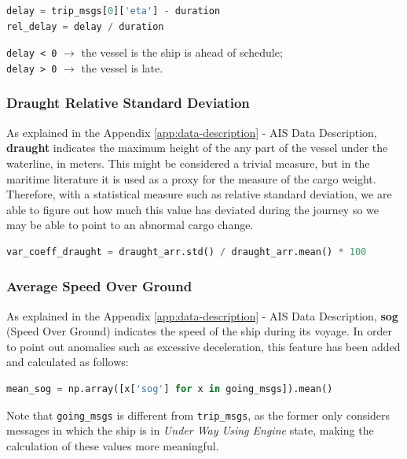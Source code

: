         \begin{lstlisting}[language=Python]
delay = trip_msgs[0]['eta'] - duration
rel_delay = delay / duration
        \end{lstlisting} 
        
        \verb|delay < 0| $\rightarrow$ the vessel is the ship is ahead of schedule;
        \\
        \verb|delay > 0| $\rightarrow$ the vessel is late.
    
    \subsubsection{Draught Relative Standard Deviation}
    As explained in the Appendix \ref{app:data-description} - AIS Data Description, \textbf{draught} indicates the maximum height of the any part of the vessel under the waterline, in meters. This might be considered a trivial measure, but in the maritime literature it is used as a proxy for the measure of the cargo weight. Therefore, with a statistical measure such as relative standard deviation, we are able to figure out how much this value has deviated during the journey so we may be able to point to an abnormal cargo change.
    
    \begin{lstlisting}[language=Python]
var_coeff_draught = draught_arr.std() / draught_arr.mean() * 100
    \end{lstlisting} 
    
    \subsubsection{Average Speed Over Ground}
    
    As explained in the Appendix \ref{app:data-description} - AIS Data Description, \textbf{sog} (Speed Over Ground) indicates the speed of the ship during its voyage. In order to point out anomalies such as excessive deceleration, this feature has been added and calculated as follows:
    
    \begin{lstlisting}[language=Python]
mean_sog = np.array([x['sog'] for x in going_msgs]).mean()
    \end{lstlisting} 
    
    Note that \verb|going_msgs| is different from \verb|trip_msgs|, as the former only considers messages in which the ship is in \textit{Under Way Using Engine} state, making the calculation of these values more meaningful.
            

